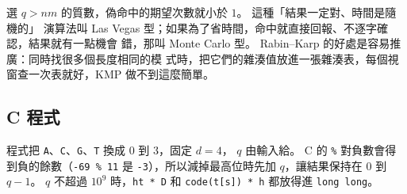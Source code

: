 選 $q > nm$ 的質數，偽命中的期望次數就小於 $1$。 這種「結果一定對、時間是隨機的」
演算法叫 Las Vegas 型；如果為了省時間，命中就直接回報、不逐字確認，結果就有一點機會
錯，那叫 Monte Carlo 型。 Rabin--Karp 的好處是容易推廣：同時找很多個長度相同的模
式時，把它們的雜湊值放進一張雜湊表，每個視窗查一次表就好，KMP 做不到這麼簡單。

\subsection{C 程式}

程式把 \texttt{A}、\texttt{C}、\texttt{G}、\texttt{T} 換成 $0$ 到 $3$，固定 $d = 4$，
$q$ 由輸入給。 C 的 \texttt{\%} 對負數會得到負的餘數（\texttt{-69 \% 11} 是
\texttt{-3}），所以減掉最高位時先加 $q$，讓結果保持在 $0$ 到 $q - 1$。 $q$ 不超過
$10^9$ 時，\texttt{ht * D} 和 \texttt{code(t[s]) * h} 都放得進 \texttt{long long}。

